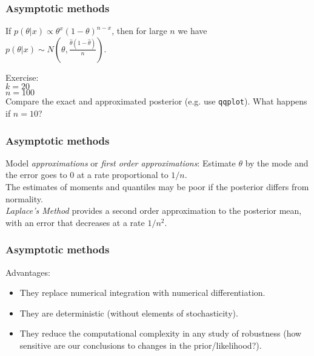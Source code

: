 \documentclass{beamer}
\newcommand{\1}{\ensuremath{\mathbf{1}}}
\begin{document}
%
%
%
\begin{frame}\frametitle{Asymptotic methods}
	\begin{block}{}
		If $p(\theta|x) \propto \theta^x (1-\theta)^{n-x}$, then for large $n$ we have\\ $p(\theta|x) \sim N(\theta,\tfrac{\hat\theta (1-\hat\theta)}{n})$.
	\end{block}
	Exercise:\\
	$k = 20$\\
	$n = 100$\\
	Compare the exact and approximated posterior (e.g. use \texttt{qqplot}). What happens if $n = 10$?
\end{frame}
%
%
%
\begin{frame}\frametitle{Asymptotic methods}
	Model \emph{approximations} or \emph{first order approximations}: Estimate $\theta$ by the mode and the error goes to 0 at a rate proportional to $1/n$.\\[2ex]
	The estimates of moments and quantiles may be poor if the posterior differs from normality.\\[2ex]
	\emph{Laplace’s Method} provides a second order approximation to the posterior mean, with an error that decreases at a rate $1/n^2$.
\end{frame}
%
%
%
\begin{frame}\frametitle{Asymptotic methods}
	Advantages:
	\begin{itemize}
		\item They replace numerical integration with numerical differentiation.
		\item They are deterministic (without elements of stochasticity).
		\item They reduce the computational complexity in any study of robustness (how sensitive are our conclusions to changes in the prior/likelihood?).
	\end{itemize}
\end{frame}
\end{document}
